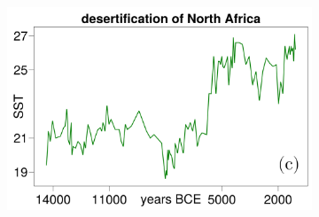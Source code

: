\documentclass[../main.tex]{subfiles}
\begin{document}
\begin{figure}[H]
    \hfill
    \begin{subfigure}[b]{0.325\textwidth}
        \centering 
        \includegraphics[keepaspectratio, width = \linewidth]{../figures/fig1.1.3.png}
        \label{fig1.1.3}
    \end{subfigure}



\end{figure}
\end{document}
